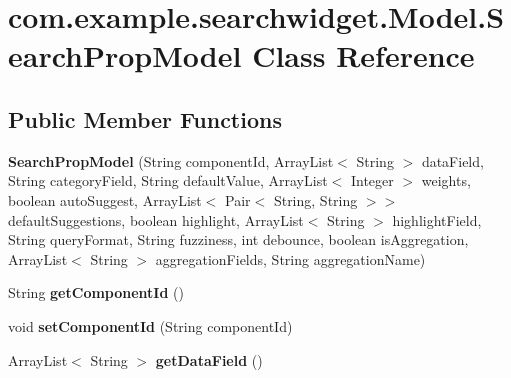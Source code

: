 \hypertarget{classcom_1_1example_1_1searchwidget_1_1_model_1_1_search_prop_model}{}\section{com.\+example.\+searchwidget.\+Model.\+Search\+Prop\+Model Class Reference}
\label{classcom_1_1example_1_1searchwidget_1_1_model_1_1_search_prop_model}
\subsection*{Public Member Functions}
\begin{DoxyCompactItemize}
\item 
\mbox{\label{classcom_1_1example_1_1searchwidget_1_1_model_1_1_search_prop_model_a06a190d2345185df64f0bb59a27c4ae6}} 
{\bfseries Search\+Prop\+Model} (String component\+Id, Array\+List$<$ String $>$ data\+Field, String category\+Field, String default\+Value, Array\+List$<$ Integer $>$ weights, boolean auto\+Suggest, Array\+List$<$ Pair$<$ String, String $>$$>$ default\+Suggestions, boolean highlight, Array\+List$<$ String $>$ highlight\+Field, String query\+Format, String fuzziness, int debounce, boolean is\+Aggregation, Array\+List$<$ String $>$ aggregation\+Fields, String aggregation\+Name)
\item 
\mbox{\label{classcom_1_1example_1_1searchwidget_1_1_model_1_1_search_prop_model_a99e8d5e07bb749b6d076bf6751cfa2b3}} 
String {\bfseries get\+Component\+Id} ()
\item 
\mbox{\label{classcom_1_1example_1_1searchwidget_1_1_model_1_1_search_prop_model_a42d9e99812c2e20d4441543dd785cbd1}} 
void {\bfseries set\+Component\+Id} (String component\+Id)
\item 
\mbox{\label{classcom_1_1example_1_1searchwidget_1_1_model_1_1_search_prop_model_acee12fb77b5f03fc130c05bd0ceecb4d}} 
Array\+List$<$ String $>$ {\bfseries get\+Data\+Field} ()
\item 
\mbox{\label{classcom_1_1example_1_1searchwidget_1_1_model_1_1_search_prop_model_ac2dd92c762bf5ea4c1facd6f9b7c7110}} 
$$
\end{DoxyCompactItemize}

